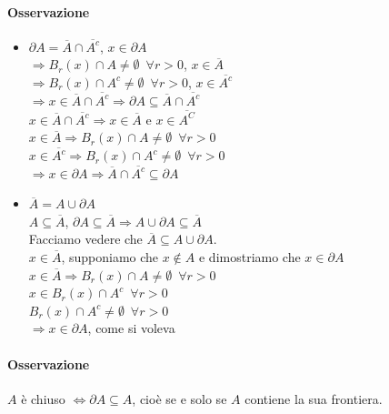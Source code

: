\documentclass{article}
\begin{document}
\paragraph{{Osservazione}}
\begin{itemize}
    \item $\partial A = \overline{A} \cap \overline{A^c}$, $x \in \partial A$\\
        $\Rightarrow B_r (x)\cap A \neq \emptyset \,\,\, \forall r>0$, $x\in \overline{A}$\\
        $\Rightarrow B_r(x)\cap A^c \neq \emptyset \,\,\,\forall r>0$, $x\in \overline{A^c}$\\
        $\Rightarrow x \in \overline{A} \cap \overline{A^c} \Rightarrow \partial A \subseteq \overline{A} \cap \overline{A^c}$\\
        $x\in\overline{A}\cap \overline{A^c} \Rightarrow x\in \overline{A} $ e $x \in \overline{A^C}$\\
        $x \in \overline{A} \Rightarrow B_r(x)\cap A\neq \emptyset\,\,\, \forall r>0$\\
        $x \in \overline{A^c} \Rightarrow B_r(x)\cap A^c \neq \emptyset\,\,\, \forall r>0$\\
        $\Rightarrow x\in \partial A \Rightarrow \overline{A} \cap \overline{A^c} \subseteq \partial A$
    \item $\overline{A}=A \cup \partial A$\\
        $A \subseteq \overline{A}$, $\partial A \subseteq \overline{A} \Rightarrow A \cup \partial A \subseteq \overline{A}$\\
        Facciamo vedere che $\overline{A}\subseteq A \cup \partial A$.\\
        $x\in \overline{A}$, supponiamo che $x\notin A$ e dimostriamo che $x \in \partial A$\\
        $x\in \overline{A}  \Rightarrow B_r(x)\cap A \neq \emptyset \,\,\, \forall r>0$\\
        $x \in B_r (x)\cap A^c \,\,\,\forall r >0$\\
        $B_r(x)\cap A^c \neq \emptyset \,\,\, \forall r>0$\\
        $\Rightarrow x\in \partial A$, come si voleva
\end{itemize}

\paragraph{{Osservazione}}
$A$ è chiuso $\Leftrightarrow \partial A \subseteq A$, cioè se e solo se $A$ contiene la sua frontiera.
\end{document}
